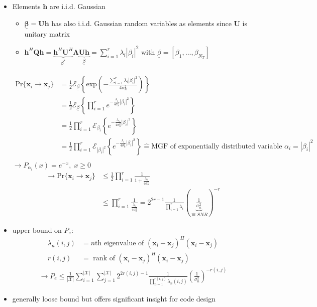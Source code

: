 \documentclass[a4paper, 10pt]{article}
\begin{document}
\begin{itemize}
	\item Elements $\mathbf{h}$ are i.i.d. Gaussian
	\begin{itemize}	
		\item $\mathbf{\underline{\beta}=Uh}$ has also i.i.d. Gaussian random variables as elements since $\mathbf{U}$ is unitary matrix
		\item $\mathbf{h}^H\mathbf{Qh}=\underbrace{\mathbf{h}^H\mathbf{U}^H}_{\underline{\beta}^*}\mathbf{\Lambda}\underbrace{\mathbf{Uh}}_{\underline{\beta}}=\sum\limits_{i=1}^r\lambda_i|\beta_i|^2$ 
		with $\underline{\beta}=[\beta_1,\dots,\beta_{N_T}]$
	\end{itemize}
	\begin{align*}
	\mathrm{Pr}\{\mathbf{x}_i\rightarrow\mathbf{x}_j\}&=\frac{1}{2}\mathcal{E}_{\underline{\beta}}\left\{\mathrm{exp}\left(-\frac{\sum\limits_{i=1}^r\lambda_i|\beta_i|^2}{4\sigma_n^2}\right)\right\}\\
	&=\frac{1}{2}\mathcal{E}_{\underline{\beta}}\left\{\prod\limits_{i=1}^r e^{-\frac{\lambda_i}{4\sigma_n^2}|\beta_i|^2}\right\}\\
	&=\frac{1}{2}\prod\limits_{i=1}^r\mathcal{E}_{\beta_i}\left\{e^{-\frac{\lambda_i}{4\sigma_n^2}|\beta_i|^2}\right\}\\
	&=\frac{1}{2}\prod\limits_{i=1}^r \mathcal{E}_{|\beta_i|^2}\left\{e^{-\frac{\lambda_i}{4\sigma_n^2}|\beta_i|^2}\right\}\mathrel{\widehat{=}}\text{MGF of exponentially distributed variable } \alpha_i=|\beta_i|^2\\
	\end{align*}
	$\rightarrow P_{\alpha_i}(x)=e^{-x},\; x\geq 0$
	\begin{align*}
	\rightarrow \mathrm{Pr}\{\mathbf{x}_i\rightarrow \mathbf{x}_j\}&\leq \frac{1}{2}\prod\limits^r_{i=1}\frac{1}{1+\frac{\lambda_i}{4\sigma_n^2}}\\
	&\leq\prod\limits^r_{i=1}\frac{1}{\frac{\lambda_i}{4\sigma_n^2}}=2^{2r-1}\frac{1}{\prod\limits^r_{i=1}\lambda_i}\left(\underbrace{\frac{1}{\sigma_n^2}}_{\mathrel{\widehat{=}}SNR}\right)^{-r}
	\end{align*}
	\item upper bound on $P_e$: 
	\begin{align*}
		\lambda_n(i,j) &= n\text{th eigenvalue of }(\mathbf{x}_i-\mathbf{x}_j)^H(\mathbf{x}_i-\mathbf{x}_j)\\
		r(i,j) &= \text{ rank of }(\mathbf{x}_i-\mathbf{x}_j)^H(\mathbf{x}_i-\mathbf{x}_j)
	\end{align*}
	\begin{align*}
	\rightarrow P_e \leq \frac{1}{\mathscr{|X|}} \sum\limits_{i=1}^{\mathscr{|X|}}\sum\limits_{j=1}^{\mathscr{|X|}}2^{2r(i,j)-1}\frac{1}{\prod\limits_{n=1}^{r(i,j)}\lambda_n(i,j)}\left(\frac{1}{\sigma_n^2}\right)^{-r(i,j)}
	\end{align*}
	\item generally loose bound but offers significant insight for code design
\end{itemize}
\end{document}
